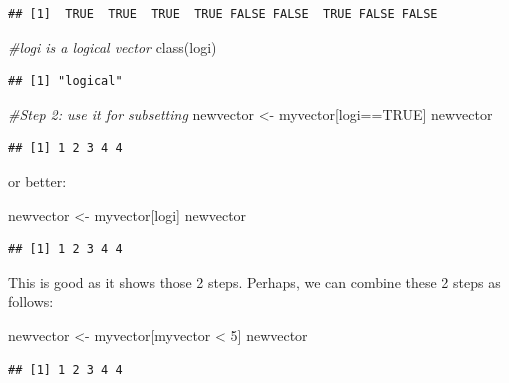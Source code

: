 \documentclass[
]{book}
\newenvironment{Shaded}{\begin{snugshade}}{\end{snugshade}}
\newcommand{\CommentTok}[1]{\textcolor[rgb]{0.56,0.35,0.01}{\textit{#1}}}
\newcommand{\ConstantTok}[1]{\textcolor[rgb]{0.00,0.00,0.00}{#1}}
\newcommand{\DecValTok}[1]{\textcolor[rgb]{0.00,0.00,0.81}{#1}}
\newcommand{\FunctionTok}[1]{\textcolor[rgb]{0.00,0.00,0.00}{#1}}
\newcommand{\NormalTok}[1]{#1}
\newcommand{\OtherTok}[1]{\textcolor[rgb]{0.56,0.35,0.01}{#1}}
\newcommand{\SpecialCharTok}[1]{\textcolor[rgb]{0.00,0.00,0.00}{#1}}
\theoremstyle{definition}
\theoremstyle{definition}
\theoremstyle{definition}
\theoremstyle{definition}
\theoremstyle{remark}
\begin{document}
\begin{verbatim}
## [1]  TRUE  TRUE  TRUE  TRUE FALSE FALSE  TRUE FALSE FALSE
\end{verbatim}

\begin{Shaded}
\begin{Highlighting}[]
\CommentTok{\#logi is a logical vector}
\FunctionTok{class}\NormalTok{(logi)}
\end{Highlighting}
\end{Shaded}

\begin{verbatim}
## [1] "logical"
\end{verbatim}

\begin{Shaded}
\begin{Highlighting}[]
\CommentTok{\#Step 2: use it for subsetting}
\NormalTok{newvector }\OtherTok{\textless{}{-}}\NormalTok{ myvector[logi}\SpecialCharTok{==}\ConstantTok{TRUE}\NormalTok{]}
\NormalTok{newvector}
\end{Highlighting}
\end{Shaded}

\begin{verbatim}
## [1] 1 2 3 4 4
\end{verbatim}

or better:

\begin{Shaded}
\begin{Highlighting}[]
\NormalTok{newvector }\OtherTok{\textless{}{-}}\NormalTok{ myvector[logi]}
\NormalTok{newvector}
\end{Highlighting}
\end{Shaded}

\begin{verbatim}
## [1] 1 2 3 4 4
\end{verbatim}

This is good as it shows those 2 steps. Perhaps, we can combine these 2 steps as follows:

\begin{Shaded}
\begin{Highlighting}[]
\NormalTok{newvector }\OtherTok{\textless{}{-}}\NormalTok{ myvector[myvector }\SpecialCharTok{\textless{}} \DecValTok{5}\NormalTok{]}
\NormalTok{newvector}
\end{Highlighting}
\end{Shaded}

\begin{verbatim}
## [1] 1 2 3 4 4
\end{verbatim}
\end{document}
